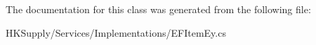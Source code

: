 The documentation for this class was generated from the following file\+:\begin{DoxyCompactItemize}
\item 
H\+K\+Supply/\+Services/\+Implementations/E\+F\+Item\+Ey.\+cs\end{DoxyCompactItemize}

